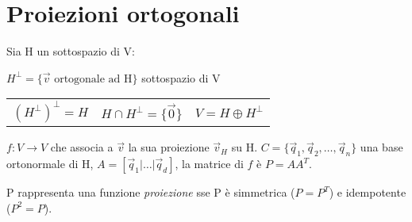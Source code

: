 \section{Proiezioni ortogonali}

Sia H un sottospazio di V:

$H^\perp = \{\vec{v}\text{ ortogonale ad H}\}$ sottospazio di V

\begin{tabular}{lll}
	$(H^\perp)^\perp = H$ & $H\cap H^\perp = \{\vec{0}\}$ & $V=H\oplus H^\perp$
\end{tabular}

$f: V \rightarrow V$ che associa a $\vec{v}$ la sua proiezione $\vec{v}_H$ su H.
$C = \{\vec{q}_1, \vec{q}_2, \dots, \vec{q}_n\}$ una base ortonormale di H, $A = [\vec{q}_1 | \dots | \vec{q}_d]$, la matrice di $f$ è $P=AA^T$.

P rappresenta una funzione \emph{proiezione} sse P è simmetrica ($P=P^T$) e idempotente ($P^2=P$).
